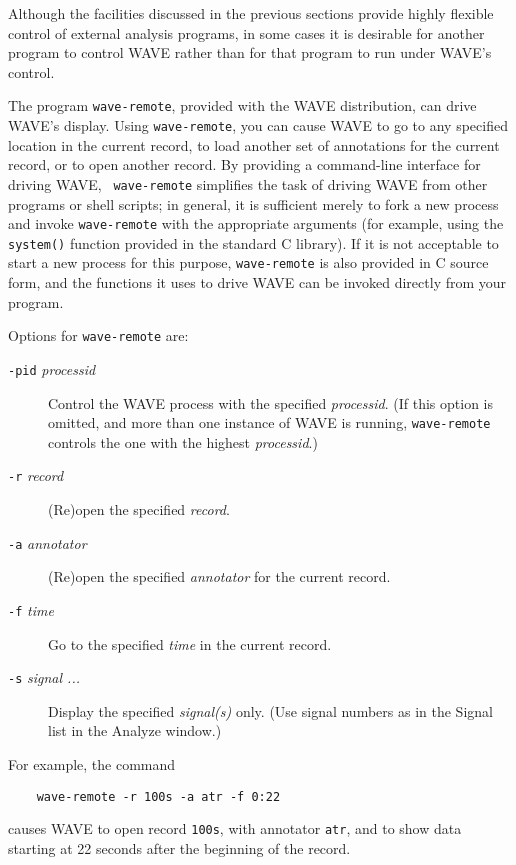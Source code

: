 \documentclass[twoside]{book}
\newcommand{\WAVE}{{\sf WAVE}\xspace}
\begin{document}
Although the facilities discussed in the previous sections provide
highly flexible control of external analysis programs, in some cases
it is desirable for another program to control \WAVE{} rather than for
that program to run under \WAVE{}'s control.

The program {\tt wave-remote}, provided with the \WAVE{} distribution,
can drive \WAVE{}'s display.  Using {\tt wave-remote}, you can cause
\WAVE{} to go to any specified location in the current record, to load
another set of annotations for the current record, or to open another
record.  By providing a command-line interface for driving \WAVE{}, {\tt
wave-remote} simplifies the task of driving \WAVE{} from other programs
or shell scripts; in general, it is sufficient merely to fork a new
process and invoke {\tt wave-remote} with the appropriate arguments
(for example, using the {\tt system()} function provided in the
standard C library).  If it is not acceptable to start a new process
for this purpose, {\tt wave-remote} is also provided in C source form,
and the functions it uses to drive \WAVE{} can be invoked directly from
your program.

Options for {\tt wave-remote} are:

\begin{description}
\item[{\tt -pid} \textit{processid}]
Control the \WAVE{} process with the specified \textit{processid}.
(If this option is omitted, and more than one instance of \WAVE{} is
running, {\tt wave-remote} controls the one with the highest
\textit{processid}.)

\item[{\tt -r} \textit{record}]
(Re)open the specified \textit{record}.

\item[{\tt -a} \textit{annotator}]
(Re)open the specified \textit{annotator} for the current record.

\item[{\tt -f} \textit{time}]
Go to the specified \textit{time} in the current record.

\item[{\tt -s} \textit{signal ...}]
Display the specified \textit{signal(s)} only.  (Use signal numbers as
in the {\sf Signal list} in the {\sf Analyze} window.)
\end{description}

For example, the command
\begin{verbatim}
    wave-remote -r 100s -a atr -f 0:22
\end{verbatim}
\noindent
causes \WAVE{} to open record {\tt 100s}, with annotator {\tt atr},
and to show data starting at 22 seconds after the beginning of the record.
\end{document}
